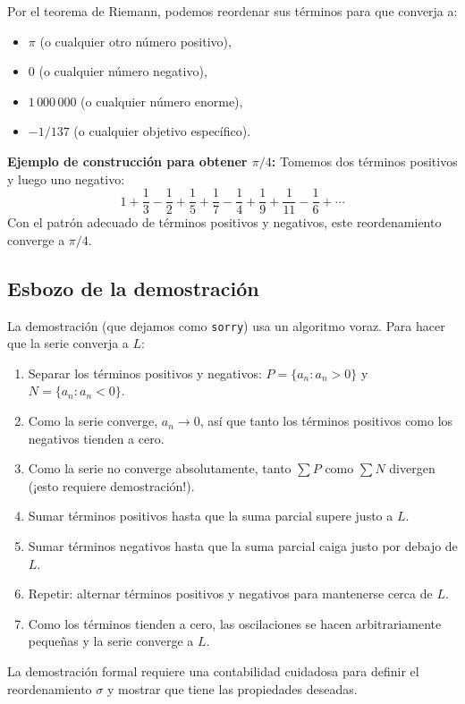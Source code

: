 Por el teorema de Riemann, podemos reordenar sus términos para que converja a:
\begin{itemize}
  \item $\pi$ (o cualquier otro número positivo),
  \item $0$ (o cualquier número negativo),
  \item $1\,000\,000$ (o cualquier número enorme),
  \item $-1/137$ (o cualquier objetivo específico).
\end{itemize}

\textbf{Ejemplo de construcción para obtener $\pi/4$:} Tomemos dos términos positivos y luego uno negativo:
\[
  1 + \frac13 - \frac12 + \frac15 + \frac17 - \frac14 + \frac19 + \frac1{11} - \frac16 + \cdots
\]
Con el patrón adecuado de términos positivos y negativos, este reordenamiento converge a $\pi/4$.

\subsection{Esbozo de la demostración}

La demostración (que dejamos como \texttt{sorry}) usa un algoritmo voraz. Para hacer que la serie converja a $L$:
\begin{enumerate}
  \item Separar los términos positivos y negativos: $P = \{a_n : a_n > 0\}$ y $N = \{a_n : a_n < 0\}$.
  \item Como la serie converge, $a_n \to 0$, así que tanto los términos positivos como los negativos tienden a cero.
  \item Como la serie no converge absolutamente, tanto $\sum P$ como $\sum N$ divergen (¡esto requiere demostración!).
  \item Sumar términos positivos hasta que la suma parcial supere justo a $L$.
  \item Sumar términos negativos hasta que la suma parcial caiga justo por debajo de $L$.
  \item Repetir: alternar términos positivos y negativos para mantenerse cerca de $L$.
  \item Como los términos tienden a cero, las oscilaciones se hacen arbitrariamente pequeñas y la serie converge a $L$.
\end{enumerate}
La demostración formal requiere una contabilidad cuidadosa para definir el reordenamiento $\sigma$ y mostrar que tiene las propiedades deseadas.

